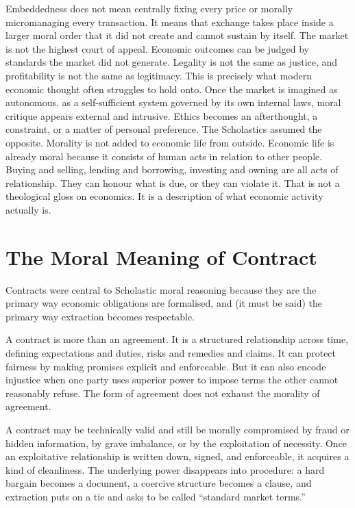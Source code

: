\documentclass[11pt,a4paper,oneside]{book}
\begin{document}
Embeddedness does not mean centrally fixing every price or morally micromanaging every transaction. It means that exchange takes place inside a larger moral order that it did not create and cannot sustain by itself. The market is not the highest court of appeal. Economic outcomes can be judged by standards the market did not generate. Legality is not the same as justice, and profitability is not the same as legitimacy. This is precisely what modern economic thought often struggles to hold onto. Once the market is imagined as autonomous, as a self-sufficient system governed by its own internal laws, moral critique appears external and intrusive. Ethics becomes an afterthought, a constraint, or a matter of personal preference. The Scholastics assumed the opposite. Morality is not added to economic life from outside. Economic life is already moral because it consists of human acts in relation to other people. Buying and selling, lending and borrowing, investing and owning are all acts of relationship. They can honour what is due, or they can violate it. That is not a theological gloss on economics. It is a description of what economic activity actually is.

\section*{The Moral Meaning of Contract}

Contracts were central to Scholastic moral reasoning because they are the primary way economic obligations are formalised, and (it must be said) the primary way extraction becomes respectable.

A contract is more than an agreement. It is a structured relationship across time, defining expectations and duties, risks and remedies and claims. It can protect fairness by making promises explicit and enforceable. But it can also encode injustice when one party uses superior power to impose terms the other cannot reasonably refuse. The form of agreement does not exhaust the morality of agreement.

A contract may be technically valid and still be morally compromised by fraud or hidden information, by grave imbalance, or by the exploitation of necessity. Once an exploitative relationship is written down, signed, and enforceable, it acquires a kind of cleanliness. The underlying power disappears into procedure: a hard bargain becomes a document, a coercive structure becomes a clause, and extraction puts on a tie and asks to be called ``standard market terms.''
\end{document}

